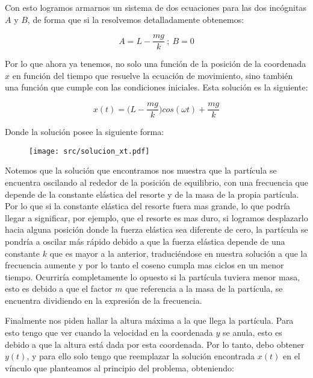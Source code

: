 \documentclass{article}
\begin{document}
\begin{multicols}{2}
Con esto logramos armarnos un sistema de dos ecuaciones para las dos incógnitas $A$ y $B$, de forma que si la resolvemos detalladamente obtenemos:

\begin{equation}
    A = L - \frac{mg}{k} \ ; \ B = 0
\end{equation}

Por lo que ahora ya tenemos, no solo una función de la posición de la coordenada $x$ en función del tiempo que resuelve la ecuación de movimiento, sino también una función que cumple con las condiciones iniciales. Esta solución es la siguiente:

\begin{equation}
    x(t) = \bigg( L - \frac{mg}{k} \bigg)cos(\omega t) + \frac{mg}{k}
\end{equation}

Donde la solución posee la siguiente forma:

\begin{figure}[H]
    \centering
    \texttt{[image: src/solucion\_xt.pdf]}
\end{figure}

Notemos que la solución que encontramos nos muestra que la partícula se encuentra oscilando al rededor de la posición de equilibrio, con una frecuencia que depende de la constante elástica del resorte y de la masa de la propia partícula. Por lo que si la constante elástica del resorte fuera mas grande, lo que podría llegar a significar, por ejemplo, que el resorte es mas duro, si logramos desplazarlo hacia alguna posición donde la fuerza elástica sea diferente de cero, la partícula se pondría a oscilar más rápido debido a que la fuerza elástica depende de una constante $k$ que es mayor a la anterior, traduciéndose en nuestra solución a que la frecuencia aumente y por lo tanto el coseno cumpla mas ciclos en un menor tiempo. Ocurriría completamente lo opuesto si la partícula tuviera menor masa, esto es debido a que el factor $m$ que referencia a la masa de la partícula, se encuentra dividiendo en la expresión de la frecuencia.

Finalmente nos piden hallar la altura máxima a la que llega la partícula. Para esto tengo que ver cuando la velocidad en la coordenada $y$ se anula, esto es debido a que la altura está dada por esta coordenada. Por lo tanto,  debo obtener $y(t)$, y para ello solo tengo que reemplazar la solución encontrada $x(t)$ en el vínculo que planteamos al principio del problema, obteniendo:


\end{multicols}
\end{document}
